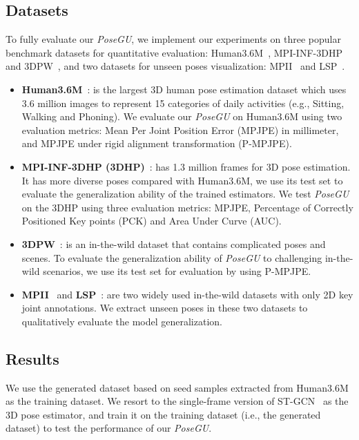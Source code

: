 \documentclass[runningheads]{llncs}
\begin{document}
\subsection{Datasets} 
To fully evaluate our \textit{PoseGU}, we implement our experiments on three popular benchmark datasets for quantitative evaluation: Human3.6M~\cite{H36M}, MPI-INF-3DHP~\cite{3DHP} and 3DPW~\cite{3DPW}, and two datasets for unseen poses visualization: MPII~\cite{mpii} and LSP~\cite{lsp}. 
\begin{itemize}
    \item \textbf{Human3.6M}~\cite{H36M}: is the largest 3D human pose estimation dataset which uses 3.6 million images to represent 15 categories of daily activities (e.g., Sitting, Walking and Phoning). 
    We evaluate our \textit{PoseGU} on Human3.6M using two evaluation metrics: Mean Per Joint Position Error (MPJPE) in millimeter, and MPJPE under rigid alignment transformation (P-MPJPE).
    \item \textbf{MPI-INF-3DHP (3DHP)}~\cite{3DHP}: has 1.3 million frames for 3D pose estimation. It has more diverse poses compared with Human3.6M, we use its test set to evaluate the generalization ability of the trained estimators. We test \textit{PoseGU} on the 3DHP using three evaluation metrics: MPJPE, Percentage of Correctly Positioned Key points (PCK) and Area Under Curve (AUC).
    \item \textbf{3DPW}~\cite{3DPW}: is an in-the-wild dataset that contains complicated poses and scenes. To evaluate the generalization ability of \textit{PoseGU} to challenging in-the-wild scenarios, we use its test set for evaluation by using P-MPJPE.
    \item \textbf{MPII}~\cite{mpii} and \textbf{LSP}~\cite{lsp}: are two widely used in-the-wild datasets with only 2D key joint annotations. 
    We extract unseen poses in these two datasets to qualitatively evaluate the model generalization.  
\end{itemize}

\subsection{Results} 
We use the generated dataset based on seed samples extracted from Human3.6M as the training dataset. 
We resort to the single-frame version of ST-GCN~\cite{stgcn} as the 3D pose estimator, and train it on the training dataset (i.e., the generated dataset) to test the performance of our \textit{PoseGU}. 
\end{document}
